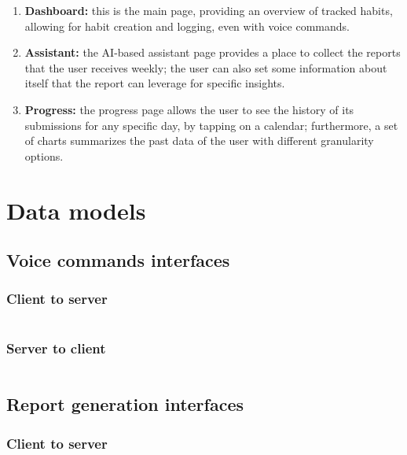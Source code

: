 \documentclass{article}
\begin{document}
\begin{enumerate}
    \item \textbf{Dashboard:} this is the main page, providing an overview of tracked habits, allowing for habit creation and logging, even with voice commands.
    \item \textbf{Assistant:} the AI-based assistant page provides a place to collect the reports that the user receives weekly; the user can also set some information about itself that the report can leverage for specific insights.
    \item \textbf{Progress:} the progress page allows the user to see the history of its submissions for any specific day, by tapping on a calendar; furthermore, a set of charts summarizes the past data of the user with different granularity options.
\end{enumerate}


\newpage
\section{Data models}

\subsection{Voice commands interfaces}

\subsubsection{Client to server}
\inputminted[fontsize=\tiny, linenos, breaklines]{json}{data-models/speech-client-to-server.json}

\newpage
\subsubsection{Server to client}
\inputminted[fontsize=\tiny, linenos, breaklines]{json}{data-models/speech-server-to-client.json}

\newpage
\subsection{Report generation interfaces}

\subsubsection{Client to server}
\inputminted[fontsize=\tiny, linenos, breaklines]{json}{data-models/report-client-to-server.json}
\end{document}
